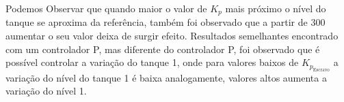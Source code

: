 Podemos Observar que quando maior o valor de $K_p$ mais próximo o nível do tanque se aproxima da referência, também foi observado que a partir de 300
aumentar o seu valor deixa de surgir efeito. Resultados semelhantes encontrado com um controlador P, mas  diferente do controlador P, foi observado que é possível
controlar a variação do tanque 1, onde para valores baixos de  $K_{p_{\textrm{Escravo}}}$ a variação do nível do tanque 1 é baixa analogamente, valores altos aumenta a variação
do nível 1.
